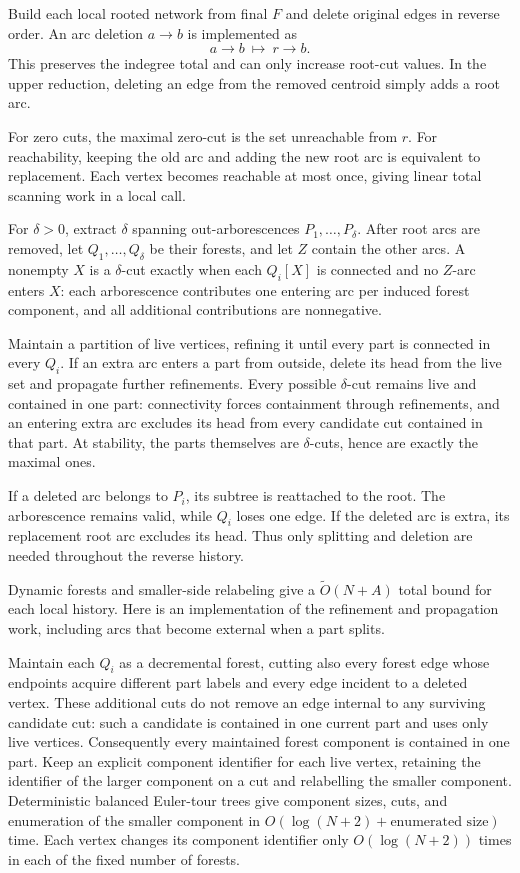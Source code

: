 \documentclass[11pt,a4paper]{article}
\theoremstyle{definition}
\theoremstyle{remark}
\newcommand{\softO}{\widetilde O}
\begin{document}
Build each local rooted network from final $F$ and delete
original edges in reverse order. An arc deletion $a\to b$
is implemented as
\begin{equation}\label{eq:transfer}
 a\to b\ \longmapsto\ r\to b.
\end{equation}
This preserves the indegree total and can only increase
root-cut values. In the upper reduction, deleting an edge
from the removed centroid simply adds a root arc.

For zero cuts, the maximal zero-cut is the set unreachable
from $r$. For reachability, keeping the old arc and adding
the new root arc is equivalent to replacement.
Each vertex becomes reachable at most once, giving linear
total scanning work in a local call.

For $\delta>0$, extract $\delta$ spanning out-arborescences
$P_1,\ldots,P_\delta$. After root arcs are removed, let
$Q_1,\ldots,Q_\delta$ be their forests, and let $Z$ contain
the other arcs. A nonempty $X$ is a $\delta$-cut exactly when
each $Q_i[X]$ is connected and no $Z$-arc enters $X$:
each arborescence contributes one entering arc per induced
forest component, and all additional contributions are
nonnegative.

Maintain a partition of live vertices, refining it until
every part is connected in every $Q_i$. If an extra arc
enters a part from outside, delete its head from the live
set and propagate further refinements. Every possible
$\delta$-cut remains live and contained in one part:
connectivity forces containment through refinements, and
an entering extra arc excludes its head from every candidate
cut contained in that part. At stability, the parts themselves
are $\delta$-cuts, hence are exactly the maximal ones.

If a deleted arc belongs to $P_i$, its subtree is reattached
to the root. The arborescence remains valid, while $Q_i$
loses one edge. If the deleted arc is extra, its replacement
root arc excludes its head. Thus only splitting and deletion
are needed throughout the reverse history.

Dynamic forests and smaller-side relabeling give a
$\softO(N+A)$ total bound for each local history. Here is an
implementation of the refinement and propagation work, including
arcs that become external when a part splits.

Maintain each $Q_i$ as a decremental forest, cutting also every
forest edge whose endpoints acquire different part labels and
every edge incident to a deleted vertex. These additional cuts
do not remove an edge internal to any surviving candidate cut:
such a candidate is contained in one current part and uses only
live vertices. Consequently every maintained forest component
is contained in one part. Keep an explicit component identifier
for each live vertex, retaining the identifier of the larger
component on a cut and relabelling the smaller component.
Deterministic balanced Euler-tour trees give component sizes,
cuts, and enumeration of the smaller component in
$O(\log(N+2)+\text{enumerated size})$ time.
Each vertex changes its component identifier only
$O(\log(N+2))$ times in each of the fixed number of forests.
\end{document}
